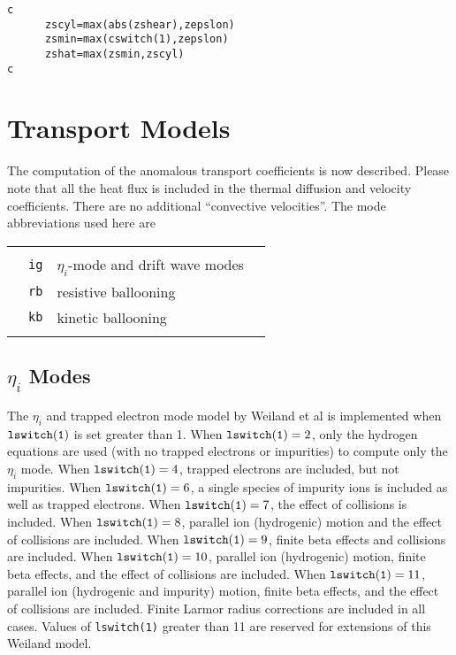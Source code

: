 \begin{verbatim}
c
      zscyl=max(abs(zshear),zepslon)
      zsmin=max(cswitch(1),zepslon)
      zshat=max(zsmin,zscyl)
c
\end{verbatim}


\section{Transport Models}

The computation of the anomalous transport coefficients is
now described.  Please note that all the heat flux is included in the
thermal diffusion and velocity coefficients.  There are no additional
``convective velocities''.
The mode abbreviations used here are
\begin{center}
\begin{tabular}{llll}
    &             &                                         &        \\
    & {\tt ig}    & $\eta_i$-mode and drift wave modes      &        \\
    & {\tt rb}    & resistive ballooning                    &        \\
    & {\tt kb}    & kinetic ballooning                      &        \\
    &             &                                         &
\end{tabular}
\end{center}


\subsection{$\eta_i$ Modes}

The $\eta_i$ and trapped electron mode model 
by Weiland et al\cite{nord90a} is implemented when
${\tt lswitch(1)}$ is set greater than 1.
When $ {\tt lswitch(1)} = 2 $, only the hydrogen equations are used
(with no trapped electrons or impurities) to compute only the 
$ \eta_i $ mode.
When $ {\tt lswitch(1)} = 4 $, trapped electrons are included,
but not impurities.
When $ {\tt lswitch(1)} = 6 $, a single species of impurity ions is
included as well as trapped electrons.
When $ {\tt lswitch(1)} = 7 $, the effect of collisions is included.
When $ {\tt lswitch(1)} = 8 $, parallel ion (hydrogenic) motion and 
the effect of collisions are included.
When $ {\tt lswitch(1)} = 9 $, finite beta effects and collisions are
included.
When $ {\tt lswitch(1)} = 10 $, parallel ion (hydrogenic) motion, 
finite beta effects, and the effect of collisions are included.
When $ {\tt lswitch(1)} = 11 $, parallel ion (hydrogenic and impurity) motion, 
finite beta effects, and the effect of collisions are included.
Finite Larmor radius corrections are included in all cases.
Values of {\tt lswitch(1)} greater than 11 are reserved for extensions
of this Weiland model.


